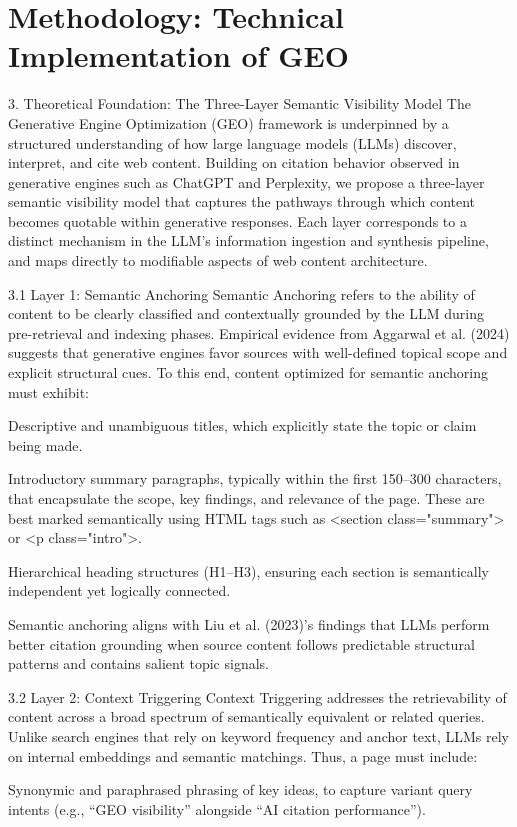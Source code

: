 \section{Methodology: Technical Implementation of GEO}

3. Theoretical Foundation: The Three-Layer Semantic Visibility Model
The Generative Engine Optimization (GEO) framework is underpinned by a structured understanding of how large language models (LLMs) discover, interpret, and cite web content. Building on citation behavior observed in generative engines such as ChatGPT and Perplexity, we propose a three-layer semantic visibility model that captures the pathways through which content becomes quotable within generative responses. Each layer corresponds to a distinct mechanism in the LLM's information ingestion and synthesis pipeline, and maps directly to modifiable aspects of web content architecture.

3.1 Layer 1: Semantic Anchoring
Semantic Anchoring refers to the ability of content to be clearly classified and contextually grounded by the LLM during pre-retrieval and indexing phases. Empirical evidence from Aggarwal et al. (2024) suggests that generative engines favor sources with well-defined topical scope and explicit structural cues. To this end, content optimized for semantic anchoring must exhibit:

Descriptive and unambiguous titles, which explicitly state the topic or claim being made.

Introductory summary paragraphs, typically within the first 150–300 characters, that encapsulate the scope, key findings, and relevance of the page. These are best marked semantically using HTML tags such as <section class="summary"> or <p class="intro">.

Hierarchical heading structures (H1–H3), ensuring each section is semantically independent yet logically connected.

Semantic anchoring aligns with Liu et al. (2023)’s findings that LLMs perform better citation grounding when source content follows predictable structural patterns and contains salient topic signals.

3.2 Layer 2: Context Triggering
Context Triggering addresses the retrievability of content across a broad spectrum of semantically equivalent or related queries. Unlike search engines that rely on keyword frequency and anchor text, LLMs rely on internal embeddings and semantic matchings. Thus, a page must include:

Synonymic and paraphrased phrasing of key ideas, to capture variant query intents (e.g., “GEO visibility” alongside “AI citation performance”).

